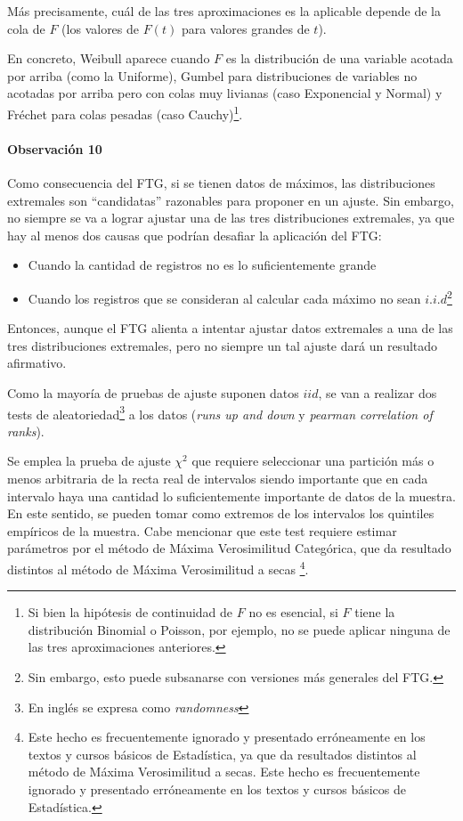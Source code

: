 \documentclass[
  12pt]{article}
\begin{document}
Más precisamente, cuál de las tres aproximaciones es la aplicable
depende de la cola de \(F\) (los valores de \(F(t)\) para valores
grandes de \(t\)).

En concreto, Weibull aparece cuando \(F\) es la distribución de una
variable acotada por arriba (como la Uniforme), Gumbel para
distribuciones de variables no acotadas por arriba pero con colas muy
livianas (caso Exponencial y Normal) y Fréchet para colas pesadas (caso
Cauchy)\footnote{Si bien  la hipótesis de continuidad de $F$ no es esencial, si $F$ tiene
la distribución Binomial o Poisson, por ejemplo, no se puede aplicar ninguna de las tres aproximaciones anteriores.}.

\paragraph*{Observación 10}

Como consecuencia del FTG, si se tienen datos de máximos, las
distribuciones extremales son ``candidatas'' razonables para proponer en
un ajuste. Sin embargo, no siempre se va a lograr ajustar una de las
tres distribuciones extremales, ya que hay al menos dos causas que
podrían desafiar la aplicación del FTG:

\begin{itemize}
\item Cuando la cantidad de registros no es lo suficientemente grande
\item Cuando los registros que se consideran al calcular cada máximo no sean $i.i.d$\footnote{Sin embargo, esto puede subsanarse con versiones más generales del FTG.}
\end{itemize}

Entonces, aunque el FTG alienta a intentar ajustar datos extremales a
una de las tres distribuciones extremales, pero no siempre un tal ajuste
dará un resultado afirmativo.

Como la mayoría de pruebas de ajuste suponen datos \(iid\), se van a
realizar dos tests de
aleatoriedad\footnote{En inglés se expresa como \textit{randomness}} a
los datos (\textit{runs up and down} y
\textit{pearman correlation of ranks}).

Se emplea la prueba de ajuste \(\chi^2\) que requiere seleccionar una
partición más o menos arbitraria de la recta real de intervalos siendo
importante que en cada intervalo haya una cantidad lo suficientemente
importante de datos de la muestra. En este sentido, se pueden tomar como
extremos de los intervalos los quintiles empíricos de la muestra. Cabe
mencionar que este test requiere estimar parámetros por el método de
Máxima Verosimilitud Categórica, que da resultado distintos al método de
Máxima Verosimilitud a secas
\footnote{Este hecho es frecuentemente ignorado y presentado erróneamente en los textos y cursos básicos de Estadística, ya que da resultados distintos al método de Máxima Verosimilitud a secas. Este hecho es frecuentemente ignorado y presentado erróneamente en los textos y cursos básicos de Estadística.}.
\end{document}
